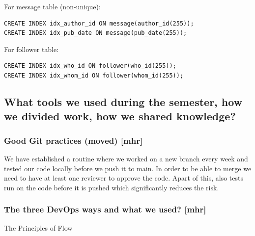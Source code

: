 \documentclass{article}
\begin{document}
For message table (non-unique):
\begin{verbatim}
CREATE INDEX idx_author_id ON message(author_id(255));
CREATE INDEX idx_pub_date ON message(pub_date(255));
\end{verbatim}

For follower table:
\begin{verbatim}
CREATE INDEX idx_who_id ON follower(who_id(255));
CREATE INDEX idx_whom_id ON follower(whom_id(255));
\end{verbatim}

\subsection{What tools we used during the semester, how we divided work, how we shared knowledge?}

\subsubsection{Good Git practices (moved) [mhr]}
We have established a routine where we worked on a new branch every week and tested our code locally before we push it to main. In order to be able to merge we need to have at least one reviewer to approve the code. Apart of this, also tests run on the code before it is pushed which significantly reduces the risk.

\subsubsection{The three DevOps ways and what we used? [mhr]} 

The Principles of Flow
\end{document}
